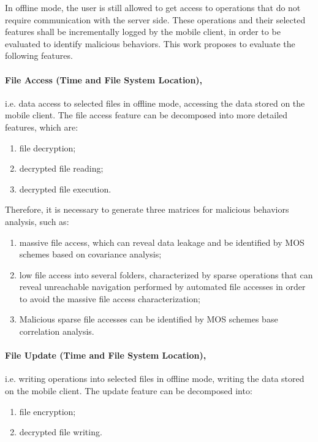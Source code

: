 \documentclass[twocolumn]{svjour3}          	%
\begin{document}
In offline mode, the user is still allowed to get access to operations that do not require communication with the server side. These operations and their selected features shall be incrementally logged by the mobile client, in order to be evaluated to identify malicious behaviors. This work proposes to evaluate the following features.

\paragraph{\textbf{File Access (Time and File System Location)},}i.e. data access to selected files in offline mode, accessing the data stored on the mobile client. The file access feature can be decomposed into more detailed features, which are:

\begin{enumerate}
	\item file decryption; 
	\item decrypted file reading;
	\item decrypted file execution. 
\end{enumerate}

Therefore, it is necessary to generate three matrices for malicious behaviors analysis, such as: 

\begin{enumerate}[label=(\alph*)]
	\item massive file access, which can reveal data leakage and be identified by MOS schemes based on covariance analysis; 
	\item low file access into several folders, characterized by sparse operations that can reveal unreachable navigation performed by automated file accesses in order to avoid the massive file access characterization;
	\item Malicious sparse file accesses can be identified by MOS schemes base correlation analysis. 
\end{enumerate}

\paragraph{\textbf{File Update (Time and File System Location)},}i.e. writing operations into selected files in offline mode, writing the data stored on the mobile client. The update feature can be decomposed into:

\begin{enumerate}
	\item file encryption;
	\item decrypted file writing.
\end{enumerate}
\end{document}
